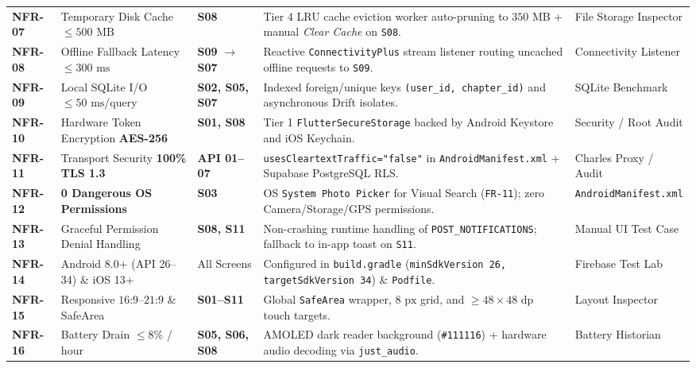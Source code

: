 \begin{table}[H]
\begin{tabularx}{\textwidth}{C{1.35cm} L{3.1cm} C{1.55cm} Y L{2.9cm}}
\mbox{\textbf{NFR-07}} & Temporary Disk Cache $\le 500\text{ MB}$ & \textbf{S08} & Tier 4 LRU cache eviction worker auto-pruning to $350\text{ MB}$ + manual \textit{Clear Cache} on \texttt{S08}. & File Storage Inspector \\
\mbox{\textbf{NFR-08}} & Offline Fallback Latency $\le 300\text{ ms}$ & \textbf{S09} $\to$ \textbf{S07} & Reactive \texttt{ConnectivityPlus} stream listener routing uncached offline requests to \texttt{S09}. & Connectivity Listener \\
\mbox{\textbf{NFR-09}} & Local SQLite I/O $\le 50\text{ ms}$/query & \textbf{S02, S05, S07} & Indexed foreign/unique keys \texttt{(user\_id, chapter\_id)} and asynchronous Drift isolates. & SQLite Benchmark \\
\mbox{\textbf{NFR-10}} & Hardware Token Encryption \textbf{AES-256} & \textbf{S01, S08} & Tier 1 \texttt{FlutterSecureStorage} backed by Android Keystore and iOS Keychain. & Security / Root Audit \\
\mbox{\textbf{NFR-11}} & Transport Security \textbf{100\% TLS 1.3} & \textbf{API 01--07} & \texttt{usesCleartextTraffic="false"} in \texttt{AndroidManifest.xml} + Supabase PostgreSQL RLS. & Charles Proxy / Audit \\
\mbox{\textbf{NFR-12}} & \textbf{0 Dangerous OS Permissions} & \textbf{S03} & OS \texttt{System Photo Picker} for Visual Search (\texttt{FR-11}); zero Camera/Storage/GPS permissions. & \texttt{Android\allowbreak Manifest.xml} \\
\mbox{\textbf{NFR-13}} & Graceful Permission Denial Handling & \textbf{S08, S11} & Non-crashing runtime handling of \texttt{POST\_NOTIFICATIONS}; fallback to in-app toast on \texttt{S11}. & Manual UI Test Case \\
\mbox{\textbf{NFR-14}} & Android 8.0+ (API 26--34) \& iOS 13+ & All Screens & Configured in \texttt{build.gradle} (\texttt{minSdkVersion 26, targetSdkVersion 34}) \& \texttt{Podfile}. & Firebase Test Lab \\
\mbox{\textbf{NFR-15}} & Responsive $16\text{:}9\text{--}21\text{:}9$ \& SafeArea & \textbf{S01--S11} & Global \texttt{SafeArea} wrapper, $8\text{ px}$ grid, and $\ge 48 \times 48\text{ dp}$ touch targets. & Layout Inspector \\
\mbox{\textbf{NFR-16}} & Battery Drain $\le 8\%$ / hour & \textbf{S05, S06, S08} & AMOLED dark reader background (\texttt{\#111116}) + hardware audio decoding via \texttt{just\_audio}. & Battery Historian \\

\end{tabularx}
\end{table}
